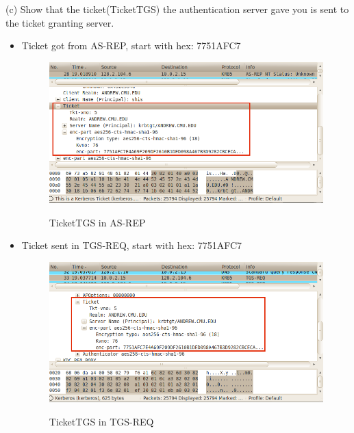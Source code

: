 \documentclass[12pt]{article}  %
\begin{document}
(c) Show that the ticket(TicketTGS) the authentication server gave you is sent to the ticket granting server.\\
\begin{itemize}
  \setlength{\itemsep}{0.5pt}
  \setlength{\parskip}{0pt}
  \setlength{\parsep}{0pt}

\item Ticket got from AS-REP, start with hex: 7751AFC7
\begin{figure}[h]
\centering
  \includegraphics[scale=0.5]{AS-TICKET.png}\\
 \caption{TicketTGS in AS-REP}
 \end{figure}
 \newline
  \newline
  \newline
\newline
\newline
  \newline
\newline
\newline
  \newline
\newline
\newline
\newline
\newline

 \item Ticket sent in TGS-REQ, start with hex: 7751AFC7
\begin{figure}[h]
\centering
  \includegraphics[scale=0.5]{TGS-REQ-TICKET.png}\\
 \caption{TicketTGS in TGS-REQ}
 \end{figure}
  
 \end{itemize}
\medskip
\end{document}

